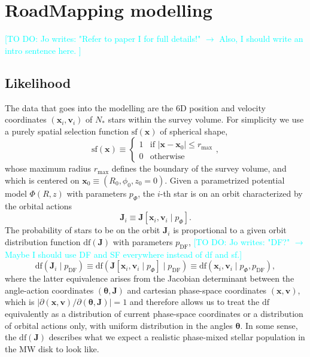 \documentclass[iop,revtex4,numberedappendix,appendixfloats]{emulateapj}
\newcommand{\vect}[1]{\boldsymbol{#1}}
\newcommand{\Jo}[1]{\textcolor{Cyan}{#1}}
\begin{document}
\section{RoadMapping modelling} \label{sec:RoadMapping}

\Jo{[TO DO: Jo writes: "Refer to paper I for full details!" $\longrightarrow$ Also, I should write an intro sentence here. ]}

\subsection{Likelihood} \label{sec:likelihood}

The data that goes into the modelling are the 6D position and velocity coordinates $(\vect{x}_i,\vect{v}_i)$ of $N_*$ stars within the survey volume. For simplicity we use a purely spatial selection function $\text{sf}(\vect{x})$ of spherical shape,
\begin{equation*}
\text{sf}(\vect{x}) \equiv \begin{cases} 1 &\mbox{if } \left| \vect{x}-\vect{x}_0 \right| \leq r_\text{max} \\
0 & \mbox{otherwise} \end{cases},
\end{equation*}
whose maximum radius $r_\text{max}$ defines the boundary of the survey volume, and which is centered on $\vect{x}_0 \equiv (R_0,\phi_0,z_0=0)$. Given a parametrized potential model $\Phi(R,z)$ with parameters $p_\Phi$, the $i$-th star is on an orbit characterized by the orbital actions 
\begin{equation*}
\vect{J}_i \equiv \vect{J}[\vect{x}_i,\vect{v}_i \mid p_\Phi].
\end{equation*}
The probability of stars to be on the orbit $\vect{J}_i$ is proportional to a given orbit distribution function $\text{df}(\vect{J})$ with parameters $p_\text{DF}$,
\Jo{[TO DO: Jo writes: "DF?" $\longrightarrow$ Maybe I should use DF and SF everywhere instead of df and sf.]}
\begin{equation*}
\text{df}(\vect{J}_i \mid p_\text{DF}) \equiv \text{df}(\vect{J}[\vect{x}_i,\vect{v}_i \mid p_\Phi] \mid p_\text{DF}) \equiv \text{df}(\vect{x}_i,\vect{v}_i \mid p_\Phi,p_\text{DF}),
\end{equation*} 
where the latter equivalence arises from the Jacobian determinant between the angle-action coordinates $(\vect{\theta},\vect{J})$ and cartesian phase-space coordinates $(\vect{x},\vect{v})$, which is $\left| \partial (\vect{x},\vect{v}) / \partial(\vect{\theta},\vect{J})\right|=1$ and therefore allows us to treat the $\text{df}$ equivalently as a distribution of current phase-space coordinates or a distribution of orbital actions only, with uniform distribution in the angles $\vect{\theta}$. In some sense, the $\text{df}(\vect{J})$ describes what we expect a realistic phase-mixed stellar population in the MW disk to look like.
\end{document}
